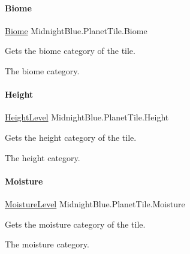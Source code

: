 \paragraph{\texorpdfstring{Biome}{Biome}}
{\footnotesize\ttfamily \hyperlink{namespace_midnight_blue_a8a6ba5637b64c3eb991f00d48decf381}{Biome} Midnight\+Blue.\+Planet\+Tile.\+Biome\hspace{0.3cm}{\ttfamily [get]}}



Gets the biome category of the tile. 

The biome category.\hypertarget{class_midnight_blue_1_1_planet_tile_a64d018817a484ab3b4559773b0971974}{}\label{class_midnight_blue_1_1_planet_tile_a64d018817a484ab3b4559773b0971974} 
\paragraph{\texorpdfstring{Height}{Height}}
{\footnotesize\ttfamily \hyperlink{namespace_midnight_blue_a86f8aaa0bbb651a6a094d3eb95f799e0}{Height\+Level} Midnight\+Blue.\+Planet\+Tile.\+Height\hspace{0.3cm}{\ttfamily [get]}}



Gets the height category of the tile. 

The height category.\hypertarget{class_midnight_blue_1_1_planet_tile_a867d91b1185e400c608eea5e20ba4614}{}\label{class_midnight_blue_1_1_planet_tile_a867d91b1185e400c608eea5e20ba4614} 
\paragraph{\texorpdfstring{Moisture}{Moisture}}
{\footnotesize\ttfamily \hyperlink{namespace_midnight_blue_a7428767e7fc0b52bab6cb270f8354e1d}{Moisture\+Level} Midnight\+Blue.\+Planet\+Tile.\+Moisture\hspace{0.3cm}{\ttfamily [get]}}



Gets the moisture category of the tile. 

The moisture category.\hypertarget{class_midnight_blue_1_1_planet_tile_a7e2a7e01274b4ea505871b115b8534ae}{}\label{class_midnight_blue_1_1_planet_tile_a7e2a7e01274b4ea505871b115b8534ae} 
